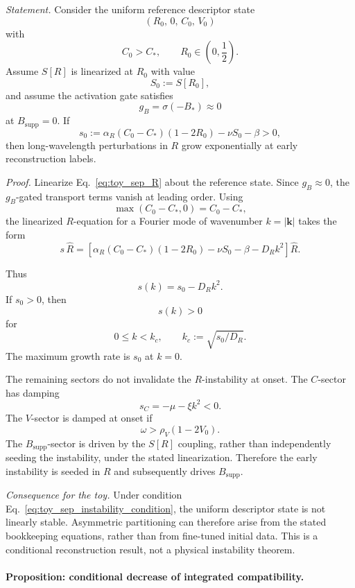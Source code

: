 \documentclass[aps,prx,onecolumn,11pt]{revtex4-2}
\theoremstyle{plain}
\theoremstyle{definition}
\theoremstyle{remark}
\begin{document}
\emph{Statement.}
Consider the uniform reference descriptor state
\[
(R_0,\,0,\,C_0,\,V_0)
\]
with
\[
C_0>C_\ast,
\qquad
R_0\in\left(0,\frac12\right).
\]
Assume \(S[R]\) is linearized at \(R_0\) with value
\[
S_0:=S[R_0],
\]
and assume the activation gate satisfies
\[
g_B=\sigma(-B_\ast)\approx 0
\]
at \(B_{\mathrm{supp}}=0\). If
\begin{equation}
s_0
:=
\alpha_R(C_0-C_\ast)(1-2R_0)
-\nu S_0
-\beta
>0,
\label{eq:toy_sep_instability_condition}
\end{equation}
then long-wavelength perturbations in \(R\) grow exponentially at early
reconstruction labels.

\emph{Proof.}
Linearize Eq.~\eqref{eq:toy_sep_R} about the reference state. Since
\(g_B\approx0\), the \(g_B\)-gated transport terms vanish at leading
order. Using
\[
\max(C_0-C_\ast,0)=C_0-C_\ast,
\]
the linearized \(R\)-equation for a Fourier mode of wavenumber
\(k=|\mathbf k|\) takes the form
\begin{equation}
s\,\hat R
=
\left[
\alpha_R(C_0-C_\ast)(1-2R_0)
-\nu S_0
-\beta
-D_R k^2
\right]\hat R.
\label{eq:lin_R}
\end{equation}

Thus
\[
s(k)=s_0-D_R k^2.
\]
If \(s_0>0\), then
\[
s(k)>0
\]
for
\[
0\leq k<k_c,
\qquad
k_c:=\sqrt{s_0/D_R}.
\]
The maximum growth rate is \(s_0\) at \(k=0\).

The remaining sectors do not invalidate the \(R\)-instability at onset.
The \(C\)-sector has damping
\[
s_C=-\mu-\xi k^2<0.
\]
The \(V\)-sector is damped at onset if
\[
\omega>\rho_V(1-2V_0).
\]
The \(B_{\mathrm{supp}}\)-sector is driven by the \(S[R]\) coupling,
rather than independently seeding the instability, under the stated
linearization. Therefore the early instability is seeded in \(R\) and
subsequently drives \(B_{\mathrm{supp}}\).

\emph{Consequence for the toy.}
Under condition Eq.~\eqref{eq:toy_sep_instability_condition}, the
uniform descriptor state is not linearly stable. Asymmetric
partitioning can therefore arise from the stated bookkeeping equations,
rather than from fine-tuned initial data. This is a conditional
reconstruction result, not a physical instability theorem.


\paragraph{Proposition: conditional decrease of integrated compatibility.}
\end{document}

